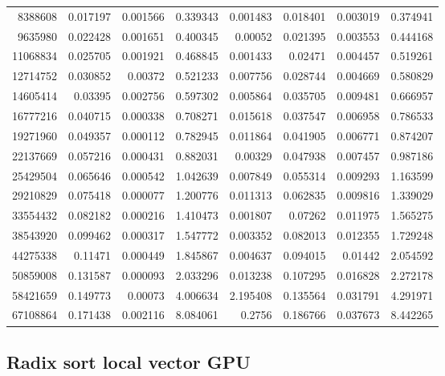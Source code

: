 \begin{longtable}{r r r r r r r r}
8388608 & 0.017197 & 0.001566 & 0.339343 & 0.001483 & 0.018401 & 0.003019 & 0.374941 \\
9635980 & 0.022428 & 0.001651 & 0.400345 & 0.00052 & 0.021395 & 0.003553 & 0.444168 \\
11068834 & 0.025705 & 0.001921 & 0.468845 & 0.001433 & 0.02471 & 0.004457 & 0.519261 \\
12714752 & 0.030852 & 0.00372 & 0.521233 & 0.007756 & 0.028744 & 0.004669 & 0.580829 \\
14605414 & 0.03395 & 0.002756 & 0.597302 & 0.005864 & 0.035705 & 0.009481 & 0.666957 \\
16777216 & 0.040715 & 0.000338 & 0.708271 & 0.015618 & 0.037547 & 0.006958 & 0.786533 \\
19271960 & 0.049357 & 0.000112 & 0.782945 & 0.011864 & 0.041905 & 0.006771 & 0.874207 \\
22137669 & 0.057216 & 0.000431 & 0.882031 & 0.00329 & 0.047938 & 0.007457 & 0.987186 \\
25429504 & 0.065646 & 0.000542 & 1.042639 & 0.007849 & 0.055314 & 0.009293 & 1.163599 \\
29210829 & 0.075418 & 0.000077 & 1.200776 & 0.011313 & 0.062835 & 0.009816 & 1.339029 \\
33554432 & 0.082182 & 0.000216 & 1.410473 & 0.001807 & 0.07262 & 0.011975 & 1.565275 \\
38543920 & 0.099462 & 0.000317 & 1.547772 & 0.003352 & 0.082013 & 0.012355 & 1.729248 \\
44275338 & 0.11471 & 0.000449 & 1.845867 & 0.004637 & 0.094015 & 0.01442 & 2.054592 \\
50859008 & 0.131587 & 0.000093 & 2.033296 & 0.013238 & 0.107295 & 0.016828 & 2.272178 \\
58421659 & 0.149773 & 0.00073 & 4.006634 & 2.195408 & 0.135564 & 0.031791 & 4.291971 \\
67108864 & 0.171438 & 0.002116 & 8.084061 & 0.2756 & 0.186766 & 0.037673 & 8.442265 \\
\end{longtable}

\subsection*{Radix sort local vector GPU}

